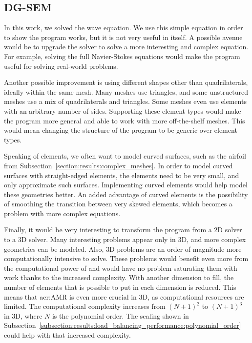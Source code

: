 \subsection{DG-SEM}\label{subsection:conclusion:future_work:dg_sem}

In this work, we solved the wave equation. We use this simple equation in order to show the program
works, but it is not very useful in itself. A possible avenue would be to upgrade the solver to
solve a more interesting and complex equation. For example, solving the full Navier-Stokes equations
would make the program useful for solving real-world problems.

Another possible improvement is using different shapes other than quadrilaterals, ideally within the
same mesh. Many meshes use triangles, and some unstructured meshes use a mix of quadrilaterals and
triangles. Some meshes even use elements with an arbitrary number of sides. Supporting these element
types would make the program more general and able to work with more off-the-shelf meshes. This
would mean changing the structure of the program to be generic over element types.

Speaking of elements, we often want to model curved surfaces, such as the airfoil from
Subsection~\ref{section:results:complex_meshes}. In order to model curved surfaces with
straight-edged elements, the elements need to be very small, and only approximate such surfaces.
Implementing curved elements would help model these geometries better. An added advantage of curved
elements is the possibility of smoothing the transition between very skewed elements, which becomes
a problem with more complex equations.

Finally, it would be very interesting to transform the program from a 2D solver to a 3D solver. Many
interesting problems appear only in 3D, and more complex geometries can be modeled. Also, 3D
problems are an order of magnitude more computationally intensive to solve. These problems would
benefit even more from the computational power of  and would have no problem
saturating them with work thanks to the increased complexity. With another dimension to fill, the
number of elements that is possible to put in each dimension is reduced. This means that
\acrshort{acr:AMR} is even more crucial in 3D, as computational resources are limited. The
computational complexity increases from \({\left( N + 1 \right)}^2\) to \({\left( N + 1 \right)}^3\)
in 3D, where \(N\) is the polynomial order. The scaling shown in
Subsection~\ref{subsection:results:load_balancing_performance:polynomial_order} could help with that
increased complexity.

